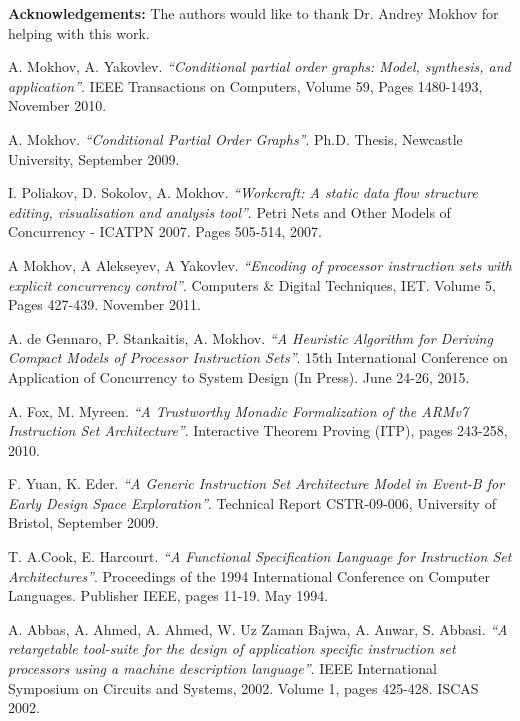 \documentclass[conference]{IEEEtran}
\begin{document}
\noindent\textbf{Acknowledgements:} The authors would like to thank Dr. Andrey Mokhov for
helping with this work.


\begin{thebibliography}{10}

	A. Mokhov, A. Yakovlev. \emph{``Conditional partial order graphs: Model,
	synthesis, and application''}. IEEE Transactions on Computers, Volume 59,
	Pages 1480-1493, November 2010.
	
	A. Mokhov. \emph{``Conditional Partial Order Graphs''}. Ph.D. Thesis,
	Newcastle University, September 2009.	

	I. Poliakov, D. Sokolov, A. Mokhov. \emph{``Workcraft: A static data flow
	structure editing, visualisation and analysis tool''}. Petri Nets and Other
	Models of Concurrency - ICATPN 2007. Pages 505-514, 2007.
	
	A Mokhov, A Alekseyev, A Yakovlev. \emph{``Encoding of processor instruction
	sets with explicit concurrency control''}. Computers \& Digital Techniques,
	IET. Volume 5, Pages 427-439. November 2011.
	
	A. de Gennaro, P. Stankaitis, A. Mokhov. \emph{``A Heuristic Algorithm for
	Deriving Compact Models of Processor Instruction Sets''}. 15th International
	Conference on Application of Concurrency to System Design (In Press). June
	24-26, 2015.

	A. Fox, M. Myreen. \emph{``A Trustworthy Monadic Formalization of the ARMv7
	Instruction Set Architecture''}. Interactive Theorem Proving (ITP), pages
	243-258, 2010.	
	
	F. Yuan, K. Eder. \emph{``A Generic Instruction Set Architecture Model in
	Event-B for Early Design Space Exploration''}. Technical Report CSTR-09-006,
	University of Bristol, September 2009.

	T. A.Cook, E. Harcourt. \emph{``A Functional Specification Language for
	Instruction Set Architectures''}. Proceedings of the 1994 International
	Conference on Computer Languages. Publisher IEEE, pages 11-19. May 1994.
	
	A. Abbas, A. Ahmed, A. Ahmed, W. Uz Zaman Bajwa, A. Anwar, S. Abbasi. 
	\emph{``A retargetable tool-suite for the design of application specific
	instruction set processors using a machine description language''}. IEEE
	International Symposium on Circuits and Systems, 2002. Volume 1, pages 425-428.
	ISCAS 2002.
	

\end{thebibliography}
\end{document}
